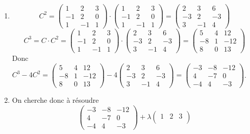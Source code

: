 \documentclass[a4paper, 10pt]{article}
\theoremstyle{plain}
\begin{document}
\begin{enumerate}
\item 
\[ 
C^2 = 
\begin{pmatrix}
1 & 2 & 3 \\
-1 & 2 & 0 \\
1 & -1 & 1
\end{pmatrix}
\cdot 
\begin{pmatrix}
1 & 2 & 3 \\
-1 & 2 & 0 \\
1 & -1 & 1
\end{pmatrix} 
= 
\begin{pmatrix}
2&3&6\\
-3&2&-3 \\
3&-1&4
\end{pmatrix}
\]
\[C^3 =C\cdot C^2 =
\begin{pmatrix}
1 & 2 & 3 \\
-1 & 2 & 0 \\
1 & -1 & 1
\end{pmatrix}
\cdot
\begin{pmatrix}
2&3&6\\
-3&2&-3 \\
3&-1&4
\end{pmatrix}
= 
\begin{pmatrix}
5 & 4 & 12 \\
-8 & 1 & -12 \\
8 & 0 &13
\end{pmatrix}
\]
Donc $C^3-4C^2 = 
\begin{pmatrix}
5 & 4 & 12 \\
-8 & 1 & -12 \\
8 & 0 &13
\end{pmatrix}
-4
\begin{pmatrix}
2&3&6\\
-3&2&-3 \\
3&-1&4
\end{pmatrix}
=
\begin{pmatrix}
-3 & -8 & -12 \\
4 & -7 & 0 \\
-4 &4 & -3
\end{pmatrix}$.
\item 
On cherche donc à résoudre 
\[
\begin{pmatrix}
-3 & -8 & -12 \\
4 & -7 & 0 \\
-4 &4 & -3
\end{pmatrix} + \lambda 
\begin{pmatrix}
1 & 2 & 3 \\

\end{pmatrix}\]
\end{enumerate}
\end{document}
